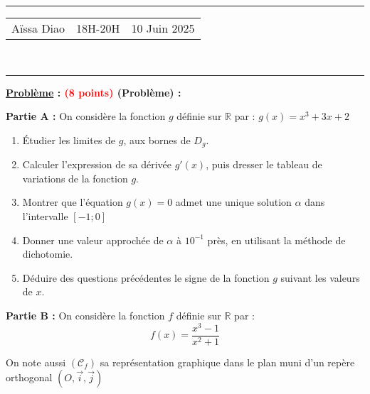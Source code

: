 \documentclass[a4paper,12pt]{article}
\begin{document}
\hrule %
\begin{center}
    \begin{tabular}{@{} p{5cm} p{5cm} p{5cm} @{}} %
        Aïssa Diao & \quad\quad\quad 18H-20H & 10 Juin 2025 \\
    \end{tabular}
    \\[-0.01cm] %
    \hrule %
\end{center}

\textbf{\underline{Problème} : \textcolor{red}{(8 points)} (Problème) :}

\textbf{Partie A :} On considère la fonction $g$ définie sur $\mathbb{R}$ par : $g(x) = x^3 + 3x + 2$

\begin{enumerate}
    \item Étudier les limites de $g$, aux bornes de $D_g$.
    \item Calculer l'expression de sa dérivée $g'(x)$, puis dresser le tableau de variations de la fonction $g$.
    \item Montrer que l'équation $g(x) = 0$ admet une unique solution $\alpha$ dans l'intervalle $[-1;0]$
    \item Donner une valeur approchée de $\alpha$ à $10^{-1}$ près, en utilisant la méthode de dichotomie.
    \item Déduire des questions précédentes le signe de la fonction $g$ suivant les valeurs de $x$.
\end{enumerate}

\vspace{0.5cm}

\textbf{Partie B :} On considère la fonction $f$ définie sur $\mathbb{R}$ par : 
\[
f(x) = \frac{x^3 - 1}{x^2 + 1}
\]

On note aussi $(\mathcal{C}_f)$ sa représentation graphique dans le plan muni d’un repère orthogonal $(O, \vec{i}, \vec{j})$
\end{document}
